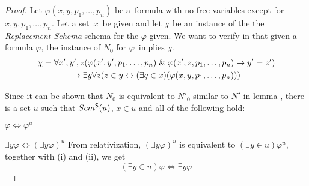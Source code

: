 \begin{proof}
Let $\varphi(x, y, p_1, \ldots, p_n)$ be a~formula with no free variables except for \\
$x, y, p_1, \ldots, p_n$.
Let a set~$x$~be given and let $\chi$ be an instance of the the \emph{Replacement Schema} schema for the $\varphi$ given.
We want to verify in  that given a formula $\varphi$, the instance of $N_0$ for $\varphi$ implies $\chi$.
\begin{equation}
\begin{gathered}
\chi = \forall x', y', z(\varphi(x', y', p_1, \ldots, p_n) \mathrel{\&} \varphi(x', z, p_1, \ldots, p_n) \rightarrow y' = z') \\
\rightarrow \exists y \forall z (z \in y \leftrightarrow (\exists q \in x)(\varphi(x, y, p_1, \ldots, p_n)))
\end{gathered}
\end{equation}

Since it can be shown that $N_0$ is equivalent to $N'_0$ similar to $N'$ in lemma , 
there is a set $u$ such that $Scm^{\sf{S}}(u)$, $x \in u$ and all of the following hold:
\bce[(i)]
\item $\varphi \iff \varphi^{u}$
\item $\exists y \varphi \iff (\exists y \varphi)^{u}$
\ece
From relativization, $(\exists y \varphi)^{u}$ is equivalent to $(\exists y \in u) \varphi^{u}$, together with (i) and (ii), we get
\begin{equation}
(\exists y \in u)\varphi \iff \exists y \varphi
\end{equation}


\end{proof}
